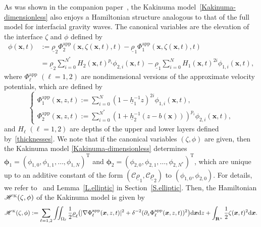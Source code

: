 \documentclass[11pt,leqno]{article}
\numberwithin{equation}{section}
\numberwithin{figure}{section}
\begin{document}
As was shown in the companion paper~\cite{DucheneIguchi2020}, the Kakinuma model~\eqref{Kakinuma-dimensionless} 
also enjoys a Hamiltonian structure analogous to that of the full model for interfacial gravity waves. 
The canonical variables are the elevation of the interface $\zeta$ and $\phi$ defined by 
%
\begin{align}\label{canonical-variable}
\phi(\bm{x},t) 
&:= \underline{\rho}_2\Phi_2^\mathrm{app}(\bm{x},\zeta(\bm{x},t),t)
  - \underline{\rho}_1\Phi_1^\mathrm{app}(\bm{x},\zeta(\bm{x},t),t) \\
&= \underline{\rho}_2\sum_{i=0}^{N^*} H_2(\bm{x},t)^{p_i}\phi_{2,i}(\bm{x},t)
  - \underline{\rho}_1\sum_{i=0}^N H_1(\bm{x},t)^{2i}\phi_{1,i}(\bm{x},t),
  \nonumber
\end{align}
%
where $\Phi_\ell^\mathrm{app}$ $(\ell=1,2)$ are nondimensional versions of the approximate velocity potentials, 
which are defined by 
%
\begin{equation}\label{Approximation-nondim} 
\begin{cases}
 \displaystyle
  \Phi_1^\mathrm{app}(\bm{x},z,t) := \sum_{i=0}^N (1-\underline{h}_1^{-1}z)^{2i}\phi_{1,i}(\bm{x},t), \\[2.5ex]
 \displaystyle
  \Phi_2^\mathrm{app}(\bm{x},z,t) := \sum_{i=0}^{N^*} (1+\underline{h}_2^{-1}(z-b(\bm{x})))^{p_i}\phi_{2,i}(\bm{x},t),
\end{cases}
\end{equation}
%
and $H_\ell$ $(\ell=1,2)$ are depths of the upper and lower layers defined by~\eqref{thicknesses}. 
We note that if the canonical variables $(\zeta,\phi)$ are given, then the Kakinuma model 
\eqref{Kakinuma-dimensionless} determines $\bm{\phi}_1=(\phi_{1,0},\phi_{1,1},\ldots,\phi_{1,N})^\mathrm{T}$ 
and $\bm{\phi}_2=(\phi_{2,0},\phi_{2,1},\ldots,\phi_{2,N^*})^\mathrm{T}$, which are unique up to an additive 
constant of the form $(\mathcal{C}\underline{\rho}_1,\mathcal{C}\underline{\rho}_2)$ to $(\phi_{1,0},\phi_{2,0})$. 
For details, we refer to~\cite[Subsection 8.1]{DucheneIguchi2020} and Lemma~\ref{L.elliptic} in Section~\ref{S.elliptic}.
Then, the Hamiltonian $\mathscr{H}^{\mbox{\rm\tiny K}}(\zeta,\phi)$ of the Kakinuma model is given by 
%
\begin{equation}\label{Hamiltonian-Kakinuma}
\mathscr{H}^{\mbox{\rm\tiny K}}(\zeta,\phi)
:= \sum_{\ell=1,2}\iint_{\Omega_\ell}\frac12\underline{\rho}_\ell
 \bigl( |\nabla\Phi_\ell^\mathrm{app}(\bm{x},z,t)|^2
  + \delta^{-2}(\partial_z\Phi_\ell^\mathrm{app}(\bm{x},z,t))^2 \bigr) \mathrm{d}\bm{x}\mathrm{d}z 
 + \int_{\mathbf{R}^n}\frac12\zeta(\bm{x},t)^2\mathrm{d}\bm{x}. 
\end{equation}
\end{document}
